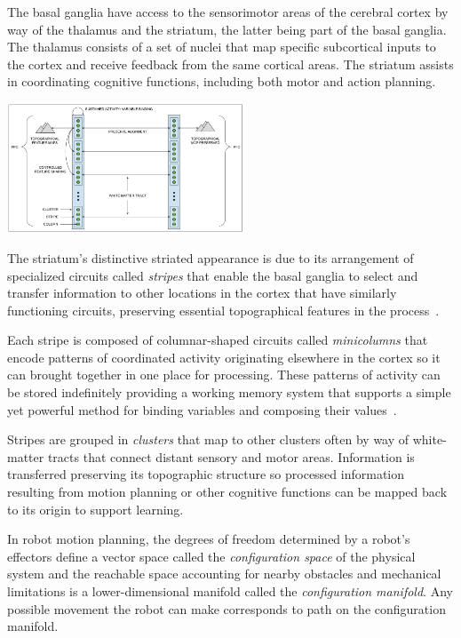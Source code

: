 \documentclass[letterpaper,11pt]{article}
\begin{document}
The basal ganglia have access to the sensorimotor areas of the cerebral cortex by way of the thalamus and the striatum, the latter being part of the basal ganglia. The thalamus consists of a set of nuclei that map specific subcortical inputs to the cortex and receive feedback from the same cortical areas. The striatum assists in coordinating cognitive functions, including both motor and action planning.

\begin{center}
  \includegraphics[width=200pt]{./figures/Columns_Stripes_Clusters_Topographic_Maps.jpg}
\end{center}

The striatum's distinctive striated appearance is due to its arrangement of specialized circuits called {\it{stripes}} that enable the basal ganglia to select and transfer information to other locations in the cortex that have similarly functioning circuits, preserving essential topographical features in the process~\cite{BarbasandGarcia-CabezasCOiN-16,LewisetalJNC-02}.

Each stripe is composed of columnar-shaped circuits called {\it{minicolumns}} that encode patterns of coordinated activity originating elsewhere in the cortex so it can brought together in one place for processing. These patterns of activity can be stored indefinitely providing a working memory system that supports a simple yet powerful method for binding variables and composing their values~\cite{OReillyetalCCN-12}.

Stripes are grouped in {\it{clusters}} that map to other clusters often by way of white-matter tracts that connect distant sensory and motor areas. Information is transferred preserving its topographic structure so processed information resulting from motion planning or other cognitive functions can be mapped back to its origin to support learning.


In robot motion planning, the degrees of freedom determined by a robot's effectors define a vector space called the {\it{configuration space}} of the physical system and the reachable space accounting for nearby obstacles and mechanical limitations is a lower-dimensional manifold called the {\it{configuration manifold}}. Any possible movement the robot can make corresponds to path on the configuration manifold.
\end{document}
